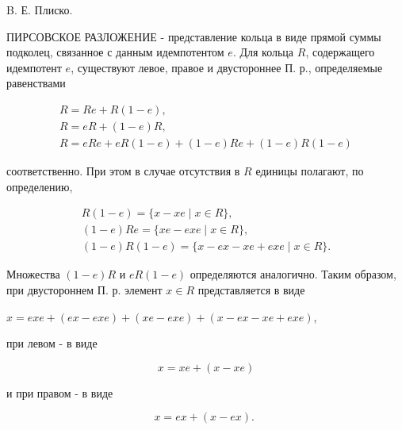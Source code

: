 \documentclass[10pt]{article}
\begin{document}
B. Е. Плиско.



ПИРСОВСКОЕ РАЗЛОЖЕНИЕ - представление кольца в виде прямой суммы подколец, связанное с данным идемпотентом $e$. Для кольца $R$, содержащего идемпотент $e$, существуют левое, правое и двустороннее П. р., определяемые равенствами



\[

\begin{gathered}

R=R e+R(1-e), \\

R=e R+(1-e) R, \\

R=e R e+e R(1-e)+(1-e) R e+(1-e) R(1-e)

\end{gathered}

\]



соответственно. При этом в случае отсутствия в $R$ единицы полагают, по определению,



\[

\begin{gathered}

R(1-e)=\{x-x e \mid x \in R\}, \\

(1-e) R e=\{x e-e x e \mid x \in R\}, \\

(1-e) R(1-e)=\{x-e x-x e+e x e \mid x \in R\} .

\end{gathered}

\]



Множества $(1-e) R$ и $e R(1-e)$ определяются аналогично. Таким образом, при двустороннем П. р. элемент $x \in R$ представляется в виде



$x=e x e+(e x-e x e)+(x e-e x e)+(x-e x-x e+e x e)$,



при левом - в виде



\[

x=x e+(x-x e)

\]



и при правом - в виде



\[

x=e x+(x-e x) \text {. }

\]
\end{document}
